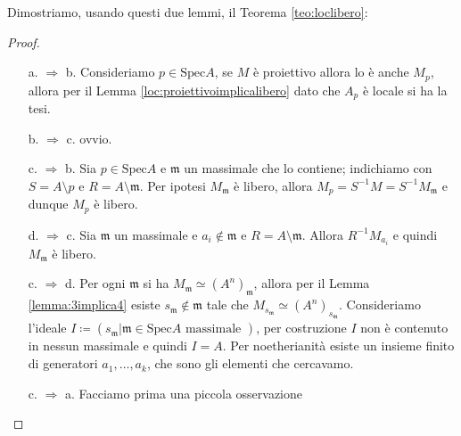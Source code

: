 \documentclass[a4paper,11pt,oneside]{book}
\newcommand{\Spec}{\mathrm{Spec}}
\newcommand{\inverti}[1]{{#1}^{-1}}
\newcommand{\m}{\mathfrak{m}}
\theoremstyle{definition}
\begin{document}
  Dimostriamo, usando questi due lemmi, il Teorema \ref{teo:loclibero}:
 \begin{proof}\
 \begin{itemize}
  \item [a. $\Rightarrow$ b.] 
	Consideriamo $p\in\Spec A$, se $M$ è proiettivo allora lo è anche $M_p$, allora per il Lemma \ref{loc:proiettivoimplicalibero}
	dato che $A_p$ è locale si ha la tesi.
  \item [b. $\Rightarrow$ c.] ovvio.
  \item [c. $\Rightarrow$ b.] Sia $p\in\Spec A$ e $\m$ un massimale che lo contiene; indichiamo con $S=A\setminus p$ e $R=A\setminus \m$.
	Per ipotesi $M_{\m}$ è libero, allora $M_p=\inverti{S}M=\inverti{S}M_{\m}$ e dunque $M_p$ è libero.
  \item [d. $\Rightarrow$ c.] Sia $\m$ un massimale e $a_i\notin\m $ e $R=A\setminus \m$. Allora $\inverti{R}M_{a_i}$ e quindi $M_{\m}$
	  è libero.
  \item [c. $\Rightarrow$ d.]  Per ogni $\m$ si ha $M_{\m}\simeq(A^n)_{\m}$, allora per il Lemma \ref{lemma:3implica4}
	  esiste $s_{\m}\notin\m$ tale che $M_{s_\m}\simeq(A^n)_{s_\m}$. Consideriamo l'ideale
	  $I\coloneqq(s_{\m}|\m\in\Spec A \text{ massimale })$, per costruzione $I$ non è contenuto in nessun massimale e quindi $I=A$.
	  Per noetherianità esiste un insieme finito di generatori $a_1,\dots, a_k$, che sono gli elementi che cercavamo.	  
  \item [c. $\Rightarrow$ a.] Facciamo prima una piccola osservazione


\end{itemize}
\end{proof}
\end{document}
